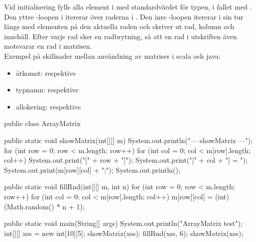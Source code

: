 \SubtaskSolved  Vid initialisering fylls alla element i  med standardvärdet för typen,  i fallet med . Den yttre -loopen i  itererar över raderna i . Den inre -loopen itererar i sin tur längs med elementen på den aktuella raden och skriver ut rad, kolumn och innehåll. Efter varje rad sker en radbrytning, så att en rad i utskriften även motsvarar en rad i matrisen.\\
Exempel på skillnader mellan användning av matriser i scala och java:
\begin{itemize}
\item åtkomst:  respektive 
\item typnamn:  respektive  
\item allokering:  respektive 
\end{itemize}

\SubtaskSolved  \begin{Code}
public class ArrayMatrix {

	public static void showMatrix(int[][] m){
		System.out.println("\n--- showMatrix ---");
		for (int row = 0; row < m.length; row++){
			for (int col = 0; col < m[row].length; col++) {
				System.out.print("[" + row + "]");
				System.out.print("[" + col + "] = ");
				System.out.print(m[row][col] + ";");
			} System.out.println();
		}
	}

	public static void fillRnd(int[][] m, int n){
		for (int row = 0; row < m.length; row++){
			for (int col = 0; col < m[row].length; col++) {
				m[row][col] = (int) (Math.random() * n + 1);
			}
		}
	}

	public static void main(String[] args) {
		System.out.println("ArrayMatrix test");
		int[][] xss = new int[10][5];
		showMatrix(xss);
		fillRnd(xss, 6);
		showMatrix(xss);
	}
}
\end{Code}

\ExtraTasks %



\QUESTEND









\QUESTBEGIN


